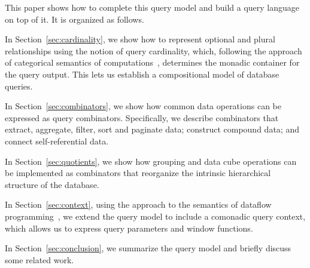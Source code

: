 This paper shows how to complete this query model and build a query language on
top of it.  It is organized as follows.

In Section~\ref{sec:cardinality}, we show how to represent optional and plural
relationships using the notion of query cardinality, which, following the
approach of categorical semantics of computations~\cite{Moggi1991}, determines
the monadic container for the query output.  This lets us establish a
compositional model of database queries.

In Section~\ref{sec:combinators}, we show how common data operations can be
expressed as query combinators.  Specifically, we describe combinators that
extract, aggregate, filter, sort and paginate data; construct compound data; and
connect self-referential data.

In Section~\ref{sec:quotients}, we show how grouping and data cube operations
can be implemented as combinators that reorganize the intrinsic hierarchical
structure of the database.

In Section~\ref{sec:context}, using the approach to the semantics of dataflow
programming~\cite{Uustalu2005}, we extend the query model to include a
comonadic query context, which allows us to express query parameters and window
functions.

In Section~\ref{sec:conclusion}, we summarize the query model and briefly
discuss some related work.

